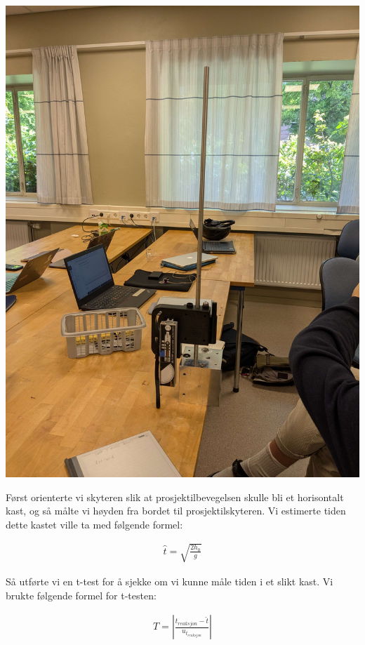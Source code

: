 \bigskip \hfil
\includegraphics[scale = 0.05]{Figurer/Projectile.jpg} 
\label{projectile}
\par \bigskip

Først orienterte vi skyteren slik at prosjektilbevegelsen skulle bli et horisontalt kast, og så målte vi høyden fra bordet til prosjektilskyteren. Vi estimerte tiden dette kastet ville ta med følgende formel:

\begin{align}
    \hat{t} = \sqrt{\frac{2h_0}{g}}\label{that}
\end{align}

Så utførte vi en t-test for å sjekke om vi kunne måle tiden i et slikt kast. Vi brukte følgende formel for t-testen:

\begin{align}
    T = \left|\frac{t_{reaksjon} - \hat{t}}{u_{t_{reaksjon}}}\right|\label{ttest}
\end{align}

